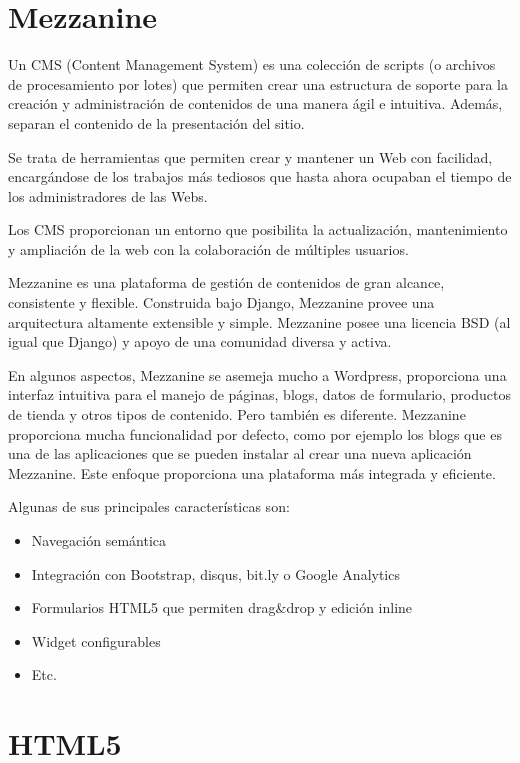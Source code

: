 \section{Mezzanine} 
\label{sec:mezzanine}

Un CMS (Content Management System) es una colección de scripts (o archivos de procesamiento por lotes) que permiten crear una estructura de soporte para la creación y administración de contenidos de una manera ágil e intuitiva. Además, separan el contenido de la presentación del sitio.


Se trata de herramientas que permiten crear y mantener un Web con facilidad, encargándose de los trabajos más tediosos que hasta ahora ocupaban el tiempo de los administradores de las Webs. 


Los CMS proporcionan un entorno que posibilita la actualización, mantenimiento y ampliación de la web con la colaboración de múltiples usuarios.


Mezzanine es una plataforma de gestión de contenidos de gran alcance, consistente y flexible. Construida bajo Django, Mezzanine provee una arquitectura altamente extensible y simple. Mezzanine posee una licencia BSD (al igual que Django) y apoyo de una comunidad diversa y activa.


En algunos aspectos, Mezzanine se asemeja mucho a Wordpress, proporciona una interfaz intuitiva para el manejo de páginas, blogs, datos de formulario, productos de tienda y otros tipos de contenido. Pero también es diferente. Mezzanine proporciona mucha funcionalidad por defecto, como por ejemplo los blogs que es una de las aplicaciones que se pueden instalar al crear una nueva aplicación Mezzanine. Este enfoque proporciona una plataforma más integrada y eficiente.


Algunas de sus principales características son:


\begin{itemize}
\item Navegación semántica
\item Integración con Bootstrap, disqus, bit.ly o Google Analytics 
\item Formularios HTML5 que permiten drag\&drop y edición inline
\item Widget configurables
\item Etc.
\end{itemize}


\section{HTML5} 
\label{sec:html5}


